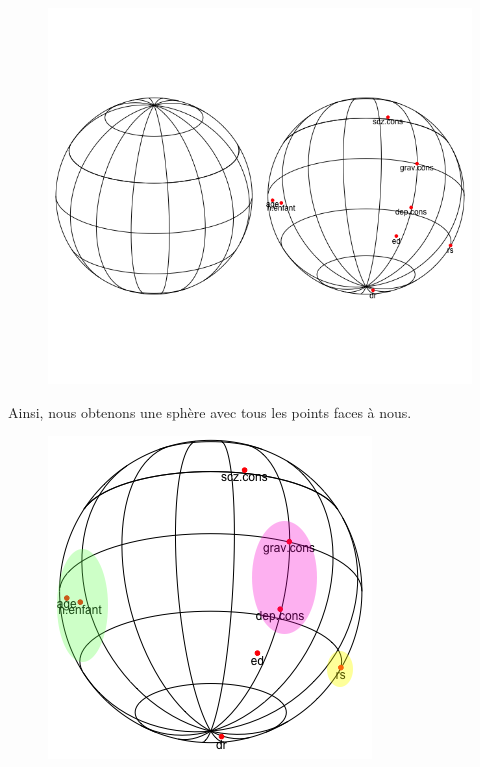 \begin{figure}[H]\begin{center}\includegraphics[scale=0.5]{ilu/ACPsphereV.png}\end{center}\end{figure}

Ainsi, nous obtenons une sphère avec tous les points faces à nous.\newline

\begin{figure}[H]\begin{center}\includegraphics[scale=0.5]{ilu/ACPsphereVgroupe.png}\end{center}\end{figure}

